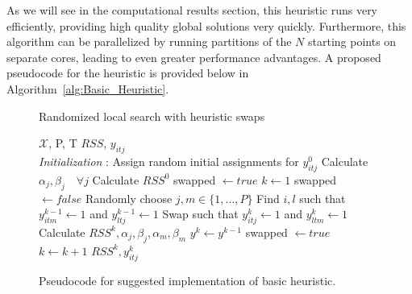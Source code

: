 As we will see in the computational results section, this heuristic runs very efficiently, providing high quality global solutions very quickly. Furthermore, this algorithm can be parallelized by running partitions of the $N$ starting points on separate cores, leading to even greater performance advantages. A proposed pseudocode for the heuristic is provided below in Algorithm~\ref{alg:Basic_Heuristic}. 

\begin{figure}
\begin{algorithm}
 \caption{Randomized local search with heuristic swaps}
 \label{alg:Basic_Heuristic}
 \begin{algorithmic}[1]
  \renewcommand{\algorithmicrequire}{\textbf{Input:}}
  \renewcommand{\algorithmicensure}{\textbf{Output:}}
 \REQUIRE $\boldsymbol{\mathcal{X}}$, P, T
 \ENSURE  $RSS$, $y_{itj}$
 \\ \textit{Initialization} : Assign random initial assignments for $y^{0}_{itj}$
  \STATE Calculate $\alpha_{j}, \beta_{j} \quad \forall j $
  \STATE Calculate $RSS^{0}$
  \STATE swapped $\leftarrow true$
  \STATE $k\leftarrow1$
  \STATE swapped $\leftarrow false$
  \STATE Randomly choose $j,m\in\{1,\ldots,P\}$
  \STATE Find $i,l$ such that $y^{k-1}_{itm}\leftarrow1$ and $y^{k-1}_{ltj}\leftarrow1$
  \STATE Swap such that $y^{k}_{itj}\leftarrow1$ and $y^{k}_{ltm}\leftarrow1$
  \STATE Calculate $RSS^{k}, \alpha_{j}, \beta_{j}, \alpha_{m}, \beta_{m}$
  \STATE $y^{k} \leftarrow y^{k-1}$
  \ELSE 
  \STATE swapped $\leftarrow true$
  \ENDIF
  \ENDFOR
  \STATE $ k \leftarrow k + 1 $
  \ENDWHILE
 \RETURN $RSS^{k}, y^{k}_{itj}$ 
 \end{algorithmic} 
 \end{algorithm}
 \caption{Pseudocode for suggested implementation of basic heuristic.}\label{Algorithm}
 \end{figure}
